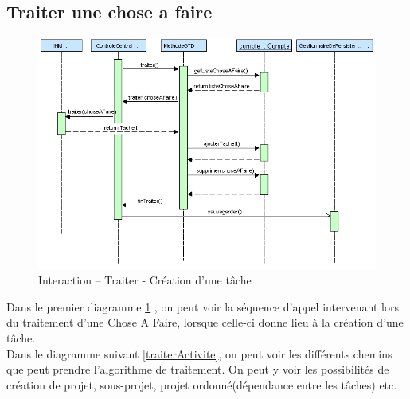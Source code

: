 \subsection{Traiter une chose a faire }

\begin{figure}[!htbp]
\centering
\includegraphics[width=12cm]{images/L3/diagrammeSequence/Traiter.png}
\caption{Interaction \--- Traiter \-- Création d'une tâche}
\label{traiterSequence}
\end{figure}

Dans le premier diagramme \ref{traiterSequence}  , on peut voir la séquence d'appel intervenant lors du traitement d'une Chose A Faire, lorsque celle-ci donne lieu à la création d'une tâche.
\\
Dans le diagramme suivant \ref{traiterActivite}, on peut voir les différents chemins que peut prendre l'algorithme de traitement. On peut y voir les possibilités de création de projet, sous-projet, projet ordonné(dépendance entre les tâches) etc.



